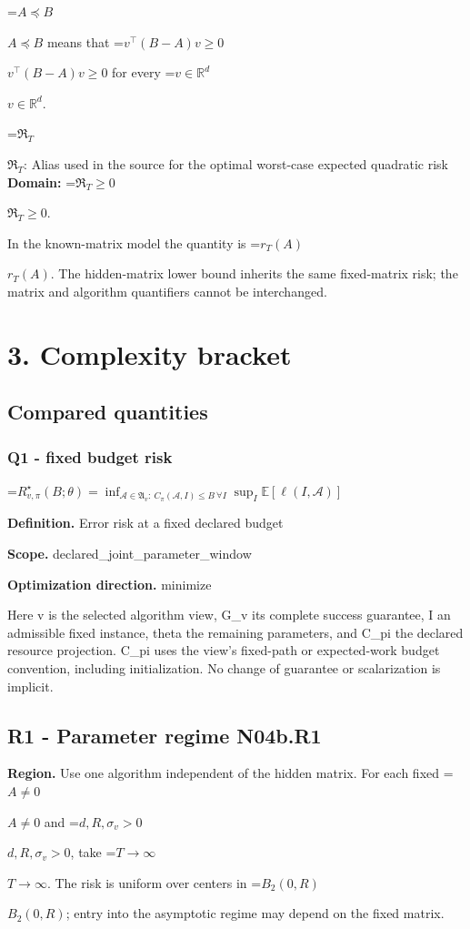\documentclass[10pt,a4paper]{article}
\newcommand{\AtlasMath}[1]{\par\begingroup\centering\setbox0=\hbox{$\displaystyle #1$}\ifdim\wd0>1.4\linewidth\typeout{ATLAS WIDE FORMULA: \the\wd0}\fi\ifdim\wd0>\linewidth\resizebox{\linewidth}{!}{\box0}\else\box0\fi\par\endgroup}
\newcommand{\AtlasInlineMath}[1]{\begingroup\setbox0=\hbox{$#1$}\ifdim\wd0>.4\linewidth\endgroup\AtlasMath{#1}\else\endgroup$#1$\fi}
\begin{document}
\AtlasInlineMath{A\preceq B} means that \AtlasInlineMath{v^\top(B-A)v\ge0} for every \AtlasInlineMath{v\in\mathbb{R}^d}.

\AtlasInlineMath{\mathfrak R_T}: Alias used in the source for the optimal worst-case expected quadratic risk \textbf{Domain:} \AtlasInlineMath{\mathfrak R_T\ge0}.

In the known-matrix model the quantity is \AtlasInlineMath{r_T(A)}. The hidden-matrix lower bound inherits the same fixed-matrix risk; the matrix and algorithm quantifiers cannot be interchanged.

\section{3. Complexity bracket}
\subsection{Compared quantities}
\subsubsection{Q1 - fixed budget risk}
\AtlasMath{R^\star_{v,\pi}(B;\theta)=\inf_{\mathcal A\in\mathfrak A_v:\ C_\pi(\mathcal A,I)\le B\ \forall I}\sup_I\mathbb E[\ell(I,\mathcal A)]}
\textbf{Definition.} Error risk at a fixed declared budget

\textbf{Scope.} declared\_joint\_parameter\_window

\textbf{Optimization direction.} minimize

Here v is the selected algorithm view, G\_v its complete success guarantee, I an admissible fixed instance, theta the remaining parameters, and C\_pi the declared resource projection. C\_pi uses the view's fixed-path or expected-work budget convention, including initialization. No change of guarantee or scalarization is implicit.

\subsection{R1 - Parameter regime N04b.R1}
\textbf{Region.} Use one algorithm independent of the hidden matrix. For each fixed \AtlasInlineMath{A\ne0} and \AtlasInlineMath{d,R,\sigma_v>0}, take \AtlasInlineMath{T\to\infty}. The risk is uniform over centers in \AtlasInlineMath{B_2(0,R)}; entry into the asymptotic regime may depend on the fixed matrix.
\end{document}
